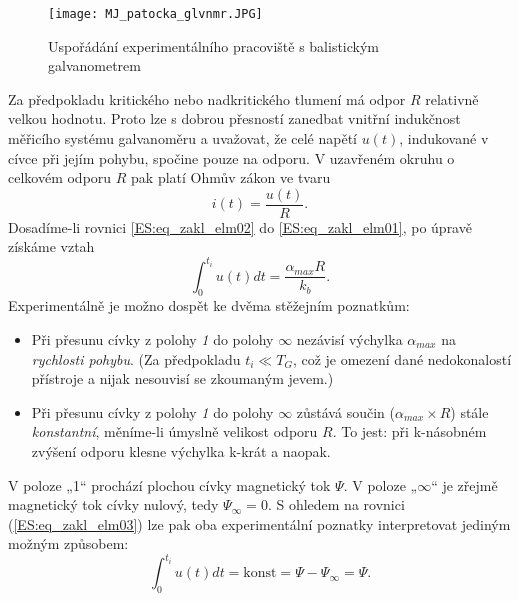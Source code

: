       \begin{figure}[ht!]
        \centering
        \texttt{[image: MJ\_patocka\_glvnmr.JPG]}
        \caption[Uspořádání experimentálního pracoviště s balistickým galvanometrem.]{Uspořádání
                 experimentálního pracoviště s balistickým galvanometrem}
        \label{es:fig_MJ_patocka_glvnmr}
      \end{figure}
      Za předpokladu kritického nebo nadkritického tlumení má odpor \(R\) relativně velkou hodnotu. 
      Proto lze s dobrou přesností zanedbat vnitřní indukčnost měřicího systému galvanoměru a 
      uvažovat, že celé napětí \(u(t)\), indukované v cívce při jejím pohybu, spočine pouze na 
      odporu. V uzavřeném okruhu o celkovém odporu \(R\) pak platí Ohmův zákon ve tvaru
      \begin{equation}\label{ES:eq_zakl_elm02}
        i(t)=\frac{u(t)}{R}.
      \end{equation}    
      Dosadíme-li rovnici \ref{ES:eq_zakl_elm02} do \ref{ES:eq_zakl_elm01}, po úpravě získáme vztah
      \begin{equation}\label{ES:eq_zakl_elm03}
       \int_0^{t_i}u(t)dt=\frac{\alpha_{max}R}{k_b}.
      \end{equation}     
      Experimentálně je možno dospět ke dvěma stěžejním poznatkům:
      \begin{itemize}
        \item Při přesunu cívky z polohy \emph{1} do polohy \(\infty\) nezávisí výchylka
              \(\alpha_{max}\) na \emph{rychlosti pohybu}. (Za předpokladu \(t_i\ll T_G\), což je
              omezení dané nedokonalostí přístroje a nijak nesouvisí se zkoumaným jevem.)
        \item Při přesunu cívky z polohy \emph{1} do polohy \(\infty\) zůstává součin
              (\(\alpha_{max}\times R\)) stále \emph{konstantní}, měníme-li úmyslně velikost odporu
              \(R\). To jest: při k-násobném zvýšení odporu klesne výchylka k-krát a naopak. 
      \end{itemize}
  
      V poloze „1“ prochází plochou cívky magnetický tok \(\Psi\). V poloze „\(\infty\)“ je zřejmě
      magnetický tok cívky nulový, tedy \(\Psi_\infty = 0\). S ohledem na rovnici
      (\ref{ES:eq_zakl_elm03}) lze pak oba experimentální poznatky interpretovat jediným možným
      způsobem:
       \begin{equation}\label{ES:eq_zakl_elm04}
       \int_0^{t_i}u(t)dt=\text{konst}=\Psi-\Psi_\infty=\Psi.
      \end{equation}    

